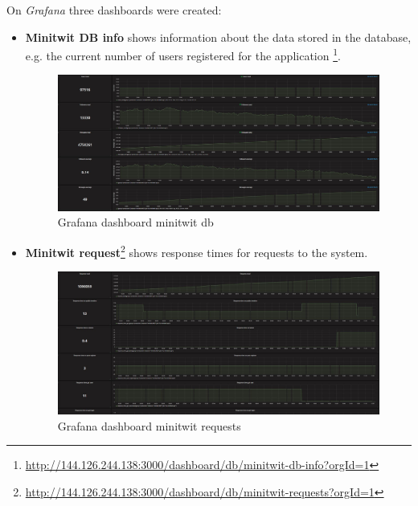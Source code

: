 On \textit{Grafana} three dashboards were created:
\begin{itemize}
    \item \textbf{Minitwit DB info} shows information about the data stored in the database, e.g. the current number of users registered for the application \footnote{\url{http://144.126.244.138:3000/dashboard/db/minitwit-db-info?orgId=1}}.
    \begin{figure}[H]
        \centering
        \includegraphics[width=1.0\textwidth]{images/Grafana_minitwit_db.JPG}
        \caption{Grafana dashboard minitwit db}
        \label{fig:grafana_db}
    \end{figure}
    
    \item \textbf{Minitwit request}\footnote{\url{http://144.126.244.138:3000/dashboard/db/minitwit-requests?orgId=1}} shows response times for requests to the system.
    \begin{figure}[H]
        \centering
        \includegraphics[width=1.0\textwidth]{images/Grafana_minitwit_requests.JPG}
        \caption{Grafana dashboard minitwit requests}
        \label{fig:grafana_requests}
    \end{figure}
    

\end{itemize}
